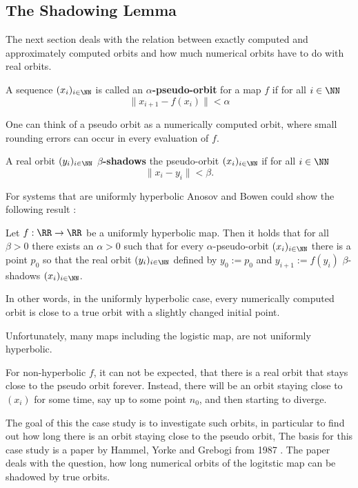   \subsection{The Shadowing Lemma}
    The next section deals with the relation between exactly computed and approximately computed orbits and how much numerical orbits have to do with real orbits. 
    \begin{definition}\label{def:pseudoorbit}
      A sequence $(x_i)_{i \in \NN}$ is called an \textbf{$\alpha$-pseudo-orbit} for a map $f$ if for all $i \in \NN$
      $$ \| x_{i+1} - f(x_i) \| < \alpha $$  
    \end{definition}
    One can think of a pseudo orbit as a numerically computed orbit, where small rounding errors can occur in every evaluation of $f$.
    \begin{definition}\label{def:shadowing}
      A real orbit $(y_i)_{i \in \NN}$ \textbf{$\beta$-shadows} the pseudo-orbit $(x_i)_{i \in \NN}$ if for all $i \in \NN$
      $$\| x_i - y_i \| < \beta.$$  
    \end{definition}
    For systems that are uniformly hyperbolic Anosov and Bowen could show the following result \cite{anosov1967} \cite{Bowen1975} \cite{Hasselblatt:2008}:
    \begin{theorem}
     Let $f: \RR \to \RR$ be a uniformly hyperbolic map.
     Then it holds that for all $\beta > 0$ there exists an $\alpha > 0$ such that for every $\alpha$-pseudo-orbit $(x_i)_{i \in \NN}$
     there is a point $p_0$ so that the real orbit $(y_i)_{i \in \NN}$ defined by $y_0 := p_0$ and $y_{i+1} := f(y_i)$ $\beta$-shadows $(x_i)_{i \in \NN}$.
    \end{theorem} 
    In other words, in the uniformly hyperbolic case, every numerically computed orbit is close to a true orbit with a slightly changed initial point.

    Unfortunately, many maps including the logistic map, are not uniformly hyperbolic. 

    For non-hyperbolic $f$, it can not be expected, that there is a real orbit that stays close to the pseudo orbit forever.
    Instead, there will be an orbit staying close to $(x_i)$ for some time, say up to some point $n_0$, and then starting to diverge. 

    The goal of this the case study is to investigate such orbits, in particular to find out how long there is an orbit staying close to the pseudo orbit,
    The basis for this case study is a paper by Hammel, Yorke and Grebogi from 1987 \cite{Hammel1987}.
    The paper deals with the question, how long numerical orbits of the logitstic map can be shadowed by true orbits.

